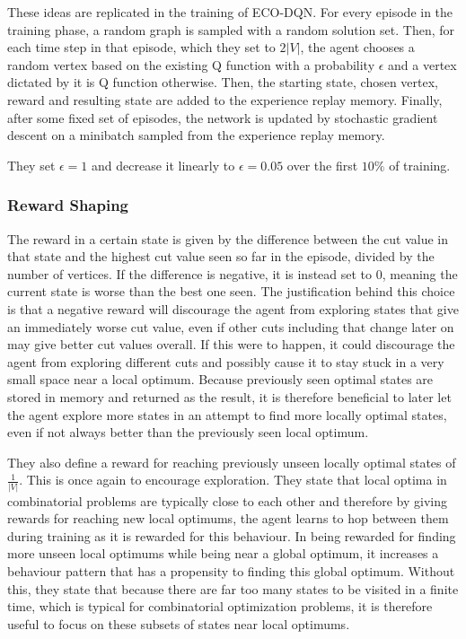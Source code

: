 \documentclass{article}
\begin{document}
These ideas are replicated in the training of ECO-DQN. For every episode in the training phase, a random graph is sampled with a random solution set. Then, for each time step in that episode, which they set to $2|V|$, the agent chooses a random vertex based on the existing Q function with a probability $\epsilon$ and a vertex dictated by it is Q function otherwise. Then, the starting state, chosen vertex, reward and resulting state are added to the experience replay memory. Finally, after some fixed set of episodes, the network is updated by stochastic gradient descent on a minibatch sampled from the experience replay memory.

They set $\epsilon = 1$ and decrease it linearly to $\epsilon=0.05$ over the first $10\%$ of training. 

\subsubsection{Reward Shaping}\label{sec:reward-shaping-eco}

The reward in a certain state is given by the difference between the cut value in that state and the highest cut value seen so far in the episode, divided by the number of vertices. If the difference is negative, it is instead set to 0, meaning the current state is worse than the best one seen. The justification behind this choice is that a negative reward will discourage the agent from exploring states that give an immediately worse cut value, even if other cuts including that change later on may give better cut values overall. If this were to happen, it could discourage the agent from exploring different cuts and possibly cause it to stay stuck in a very small space near a local optimum. Because previously seen optimal states are stored in memory and returned as the result, it is therefore beneficial to later let the agent explore more states in an attempt to find more locally optimal states, even if not always better than the previously seen local optimum.

They also define a reward for reaching previously unseen locally optimal states of $\frac{1}{|V|}$. This is once again to encourage exploration. They state that local optima in combinatorial problems are typically close to each other and therefore by giving rewards for reaching new local optimums, the agent learns to hop between them during training as it is rewarded for this behaviour. In being rewarded for finding more unseen local optimums while being near a global optimum, it increases a behaviour pattern that has a propensity to finding this global optimum. Without this, they state that because there are far too many states to be visited in a finite time, which is typical for combinatorial optimization problems, it is therefore useful to focus on these subsets of states near local optimums.
\end{document}
